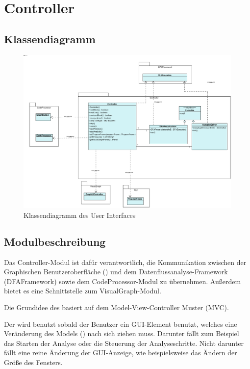 
\section{Controller}

\subsection{Klassendiagramm}

\begin{figure}[htbp] 
  \centering
  		 \includegraphics[width=1\textwidth]{Klassenuebersicht/Controller/Controller}
  \caption{Klassendiagramm des User Interfaces}
  \label{fig:UI}
\end{figure}

\subsection{Modulbeschreibung}

Das Controller-Modul ist dafür verantwortlich, die Kommunikation zwischen der Graphischen Benutzeroberfläche () und dem Datenflussanalyse-Framework (DFAFramework) sowie dem CodeProcessor-Modul zu übernehmen.
Außerdem bietet es eine Schnittstelle zum VisualGraph-Modul.

Die Grundidee des  basiert auf dem Model-View-Controller Muster (MVC).

Der  wird benutzt sobald der Benutzer ein GUI-Element benutzt, welches eine Veränderung des Models () nach sich ziehen muss. Darunter fällt zum Beispiel das Starten der Analyse oder die Steuerung der Analyseschritte.
Nicht darunter fällt eine reine Änderung der GUI-Anzeige, wie beispielsweise das Ändern der Größe des Fensters.

